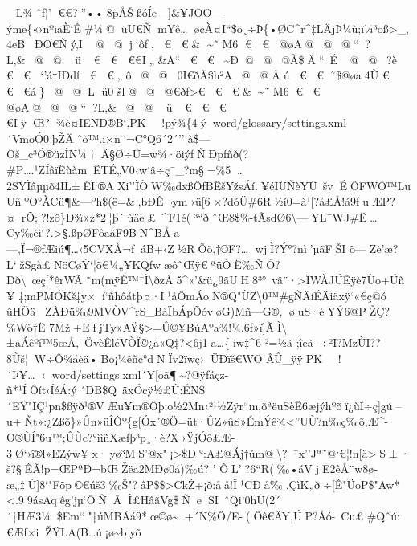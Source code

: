 L¾ ˆf¦'
€€?''••8pÅŠß\textbar óÍe---{]}\&¥JOO---ýme\{«›nºiäÈ`Ê\#¼@ üU€ÑmYê\ldots ø¢À¤I``\$ö¸÷Þ\{•ØC\^{}r\^{}‡LÄjÞ¼ù;ï¼³oß\textgreater\_,4eB ÐO€Ñý,I
@ @ j`ôƒ‚  €  € \& \textasciitilde˜M6 €  €  @øA@ @ @ ``?L‚\&@ @  ü~ €  €  €€I„\&A`` € 
€ \textasciitilde Ð@ @ @À\$Â``~É@ @ ?è €  €  `' á‡IÐdƒ  €  € „ô@ @ 0I€ðÃ\$h²A @ @ Âú  € 
€ ˜\$@øa4Ù €  €  € á\} @ @ L ü0 šl@ @ @€ðƒ\textgreater€  €  € \& \textasciitilde˜M6
€  €  @øA@ @ @ ``?L‚\&@ @  ü~ €  € 
€€IÿŒ?¾è¤    IEND®B`‚PK     ! pý¾\{4  ý     word/glossary/settings.xml´VmoÓ0þŽÄˆò™.i×n¨¬C°Q6´2´''à\$---Öš\_¢³Ó®üzÎN¼†¦Ä§Ø÷Ü=w¾·öìýƒÑÐp­fñð(?\#P\ldots.¹ZÍâïËùàmËTÉ„V0‹w`â÷ç¯\_?m§¬\%5\ldots2SYÌâµµõ4IL±ÉÌ`®AXi''ÌÒW‰dxßÔƒBËšYžsÁí.¥éIÜÑèYÜ~švÉÔFWÖ™LuUñºO°ÀCü¶\&---ºh\$(ë=\&‚bÐÊ¬ym›ü{[}6×?dóÜ\#6R½í0=à¹{[}?å£Å!á9ƒuÆP?¤rÕ;?!zô\}D¾»\textquotesingle z*2¦þ´ùäe£\textquotesingle\textquotesingle\^{}F1é(³``ðˆŒ8\$\%-tÃsdØ6\textbackslash---YL¯WJ\#Ë\ldots Cy‰èi`?.\textgreater§.ßpØFôaäF9B\textquotesingle N\^{}BÅa---,Ï¬®ƒÆiú¶\ldots‹5CVXÀ¬fáB+‹Z½RÕö‚† ©F?\ldots
wjÌ?Ý°?nì'µãFŠI
õ---Zè'æ?L`žSgà£NöCøÝ`¦õ€¼„¥KQfwæô˜Œÿ€ªüÒË‰ÑÒ?Dð\textbackslash ~œç{[}*êrWÃ˜m(mÿÉ™¯Ì\textbackslash ðzÁ5\^{}«'\&ü¿9ãUH8³°~vâ¨·\textgreater ÏWÀJÚÊÿè7Ùo+Úñ¥
‡;­mPMÓKš‡y×í`ñhôátþ\textquotesingle¤·I¹åÔmÁoN®Q"ÙZ\textbackslash0™\#gÑÂíÉÄiäxÿ`«€ç@ó
ûHÖäZÀÐü‰9MV ÒV\^{}rS\_BåÏbÁpÕóvøG)Mñ---G®‚ øuS·èYÝ6@PŽÇ?\%Wö†Ë
7Mž+EfjTy»AŸ§\textgreater=Û©¥BúAºa¾!¼.6ƒ»ï{]}ÃÌ\textbackslash±aÁêºí™\textbar5œÅ‚¯ÖvèÊléVÒÏ©¿ä«Q‡?\textless6j1a\ldots\{iw‡\^{}6
²=½ã ;îeã ÷²I?MzÙI??8Ùš¦W÷Ô¾áèä•Bo¡¼êñ\textquotesingle¢°dNÏv2ïwç›ÜÐïš€WO
ÂÛ\_   ÿÿ PK     ! ´Þ¥\ldots  ‹     word/settings.xml´Y{[}oã¶\textasciitilde?@ÿƒáçz-ñ*¹ÍÔít‹ÍéÁ:ý´D\textquotesingle B\$Q~äxÓ¢ÿ½£Û:ÉNŠ´EŸ"ÏÇ¹pn\$\textquotesingle ßÿð¹®VÆu¥m®Öþ;o½2Mn‹²¹½Zÿr``m‚õªëuSèÊ6æjýhºõï¿ùÏ÷ç{]}gú--u+Ñt»:¿Zßõ\}»Ûn»üÎÔº\{g{[}Ó x´®Ö=üt·ÛZ»ûS»ÉmÝê¾\textless''UÙ?n‰ç‰õ,Æ\^{}­O®ÙÍ"6u™;ÛÙc?°ììñXæfþ³p¸·è?X›ŸjÓô£Æ­3Ø`›î®l»EZýw¥x·yø³MS'@x"¡\textgreater\textquotesingle\$D°:A£@Áj†úm@\textbackslash?~¯x''Jª˜@`€¦!n{[}ä\textquotesingle\textgreaterS±·š?§ÊÃ\textbar!p=ŒPªÐ¬bŒŽëa2MÐø0á)‰ú?
'
ÔL'?6``R(‰\textbar•áV\textquotesinglejE2êÅ¨w8ø\textquotesingle@­æ„‡Ú{]}8`"Fõp©€úš3‰Š"?âP\$\$\textgreater CkŽ+¡ð:åå!Î¹CÐå‰.ÇìK„ð÷{[}Ê"ÜoP\$"Aw*\textless.99ásAqêg!jµ`ÔÑÂÎ£HâãVg\$Ñ\textbareSI~ˆQi'0hÙ(2´
´‡HÆ3¼\$Em``"‡úMBÂá9*œ©ø\textasciitilde+´N\%Ô/E-\textbar(Ôê€ÂY‚ÚP?Åó-~Cu£\#Qˆú:€Æƒ×iŽŸLA(B\ldots ú \textquotesingle¡ø\textasciitilde byõ
